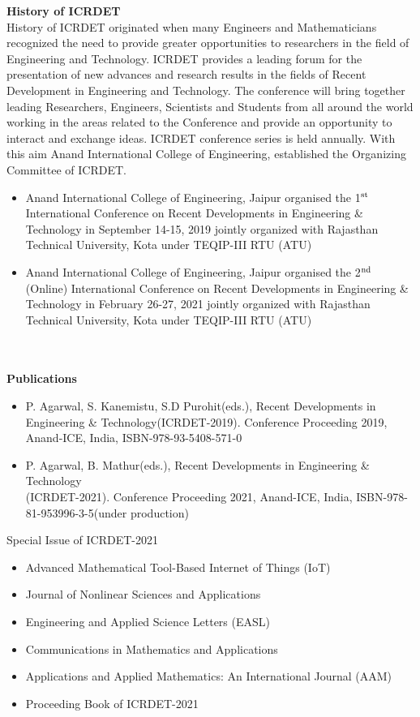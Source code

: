 \documentclass[twoside,11pt]{amsart}
\begin{document}
\newpage
\noindent
{\Large \bf
History of ICRDET
}
\\

History of ICRDET originated when many Engineers and Mathematicians recognized the
need to provide greater opportunities to researchers in the field of Engineering and Technology.
ICRDET provides a leading forum for the presentation of new advances and research results in the
fields of Recent Development in Engineering and Technology. The conference will bring together
leading Researchers, Engineers, Scientists and Students from all around the world working in the
areas related to the Conference and provide an opportunity to interact and exchange ideas. ICRDET
conference series is held annually. With this aim Anand International College of Engineering,
established the Organizing Committee of ICRDET.
\begin{itemize}
  \item Anand International College of Engineering, Jaipur organised the 1${}^{\rm st}$ International
Conference on Recent Developments in Engineering \& Technology in September 14-15,
2019 jointly organized with Rajasthan Technical University, Kota under TEQIP-III RTU
(ATU)
  \item Anand International College of Engineering, Jaipur organised the 2${}^{\rm nd}$ (Online) International
Conference on Recent Developments in Engineering \& Technology in February 26-27,
2021 jointly organized with Rajasthan Technical University, Kota under TEQIP-III RTU
(ATU)
\end{itemize}
\noindent
\\
\\
{\Large \bf
Publications
}
\\
\begin{itemize}
\item P. Agarwal, S. Kanemistu, S.D Purohit(eds.), Recent Developments in Engineering \&
Technology(ICRDET-2019). Conference Proceeding 2019, Anand-ICE, India, ISBN-978-93-5408-571-0
\item P. Agarwal, B. Mathur(eds.), Recent Developments in Engineering \&
Technology\\(ICRDET-2021). Conference Proceeding 2021, Anand-ICE, India, ISBN-978-81-953996-3-5(under production)
\end{itemize}
\vskip 8mm
\begin{flushleft}
Special Issue of ICRDET-2021
\end{flushleft}
\hskip 3mm
\begin{itemize}
\item Advanced Mathematical Tool-Based Internet of Things (IoT)
\item Journal of Nonlinear Sciences and Applications
\item Engineering and Applied Science Letters (EASL)
\item Communications in Mathematics and Applications
\item Applications and Applied Mathematics: An International Journal (AAM)
\item Proceeding Book of ICRDET-2021
\end{itemize}
\end{document}
